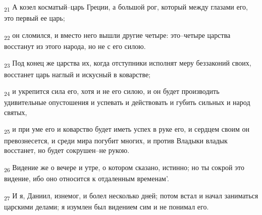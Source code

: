 \begin{tcolorbox}
\textsubscript{21} А козел косматый--царь Греции, а большой рог, который между глазами его, это первый ее царь;
\end{tcolorbox}
\begin{tcolorbox}
\textsubscript{22} он сломился, и вместо него вышли другие четыре: это--четыре царства восстанут из этого народа, но не с его силою.
\end{tcolorbox}
\begin{tcolorbox}
\textsubscript{23} Под конец же царства их, когда отступники исполнят меру беззаконий своих, восстанет царь наглый и искусный в коварстве;
\end{tcolorbox}
\begin{tcolorbox}
\textsubscript{24} и укрепится сила его, хотя и не его силою, и он будет производить удивительные опустошения и успевать и действовать и губить сильных и народ святых,
\end{tcolorbox}
\begin{tcolorbox}
\textsubscript{25} и при уме его и коварство будет иметь успех в руке его, и сердцем своим он превознесется, и среди мира погубит многих, и против Владыки владык восстанет, но будет сокрушен--не рукою.
\end{tcolorbox}
\begin{tcolorbox}
\textsubscript{26} Видение же о вечере и утре, о котором сказано, истинно; но ты сокрой это видение, ибо оно относится к отдаленным временам'.
\end{tcolorbox}
\begin{tcolorbox}
\textsubscript{27} И я, Даниил, изнемог, и болел несколько дней; потом встал и начал заниматься царскими делами; я изумлен был видением сим и не понимал его.
\end{tcolorbox}
